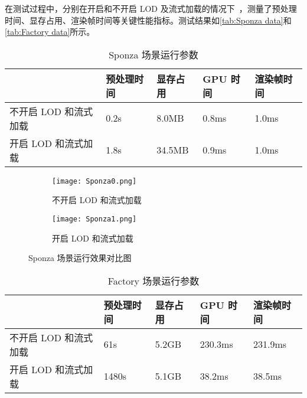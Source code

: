 在测试过程中，分别在开启和不开启 LOD 及流式加载的情况下~\cite{zjuthesis}，测量了预处理时间、显存占用、渲染帧时间等关键性能指标。测试结果如\autoref{tab:Sponza data}和\autoref{tab:Factory data}所示。

\begin{table}[htb]
    \caption{\label{tab:Sponza data}Sponza 场景运行参数}
    \begin{tabularx}{\linewidth}{|X<{\centering}|X<{\centering}|X<{\centering}|X<{\centering}|X<{\centering}|}
        \hline
        ~ & 预处理时间 & 显存占用 & GPU 时间 & 渲染帧时间 \\ \hline
        不开启 LOD 和流式加载 & 0.2s & 8.0MB & 0.8ms & 1.0ms \\ \hline
        开启 LOD 和流式加载 & 1.8s & 34.5MB & 0.9ms & 1.0ms \\ \hline
    \end{tabularx}
\end{table}

\begin{figure*}[htb]
    \centering
    \begin{subfigure}[b]{0.48\linewidth}
        \centering
        \texttt{[image: Sponza0.png]}
        \caption{不开启 LOD 和流式加载}
    \end{subfigure}%
    \hfill %
    \begin{subfigure}[b]{0.48\linewidth}
        \centering
        \texttt{[image: Sponza1.png]}
        \caption{开启 LOD 和流式加载}
    \end{subfigure}%
    \caption{Sponza 场景运行效果对比图}
    \vspace{-0.2cm}
    \label{fig:Sponza fig}
\end{figure*}

\begin{table}[htb]
    \caption{\label{tab:Factory data}Factory 场景运行参数}
    \begin{tabularx}{\linewidth}{|X<{\centering}|X<{\centering}|X<{\centering}|X<{\centering}|X<{\centering}|}
        \hline
        ~ & 预处理时间 & 显存占用 & GPU 时间 & 渲染帧时间 \\ \hline
        不开启 LOD 和流式加载 & 61s & 5.2GB & 230.3ms & 231.9ms \\ \hline
        开启 LOD 和流式加载 & 1480s & 5.1GB & 38.2ms & 38.5ms \\ \hline
    \end{tabularx}
\end{table}

